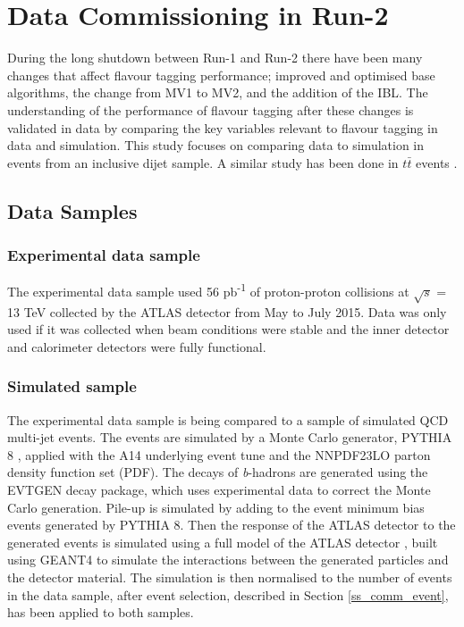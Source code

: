 \documentclass[12pt, onecolumn,notitlepage]{article}
\begin{document}
\section{Data Commissioning in Run-2} \label{s_comm}

During the long shutdown between Run-1 and Run-2 there have been many changes that affect
 flavour tagging performance;
improved and optimised base algorithms, the change from MV1 to MV2, and the addition of the IBL.
The understanding of the performance of flavour tagging after these changes is validated in data  
by comparing the key variables relevant to flavour tagging in data and simulation. 
This study focuses on comparing data to simulation in events from an inclusive dijet sample.
A similar study has been done in $t\bar{t}$ events \cite{bib_ttbar_comm}.

\subsection{Data Samples} 

\subsubsection{Experimental data sample}

The experimental data sample used 56 pb\textsuperscript{-1} of proton-proton collisions at $\sqrt{s}$ = 13 TeV collected by the ATLAS detector from May to July 2015.
Data was only used if it was collected when beam conditions were stable and the inner detector and calorimeter detectors were fully functional.

\subsubsection{Simulated sample} \label{ss_comm_simulation}

The experimental data sample is being compared to a sample of simulated QCD multi-jet events.
The events are simulated by a Monte Carlo generator, PYTHIA 8 \cite{bib_pythia8}, 
applied with the A14 \cite{bib_A14} underlying event tune and the NNPDF23LO \cite{bib_PDF} parton density function set (PDF).
The decays of \textit{b}-hadrons are generated using the EVTGEN \cite{bib_evtgen} decay package, which uses experimental data to correct the Monte Carlo generation.
Pile-up is simulated by adding to the event minimum bias events generated by PYTHIA 8.
Then the response of the ATLAS detector to the generated events is simulated using a full model of the ATLAS detector \cite{bib_atlas-simulation},
built using GEANT4 \cite{bib_geant4} to simulate the interactions between the generated particles and the detector material.
The simulation is then normalised to the number of events in the data sample, after event selection, described in Section \ref{ss_comm_event}, has been applied to both samples.
\end{document}
